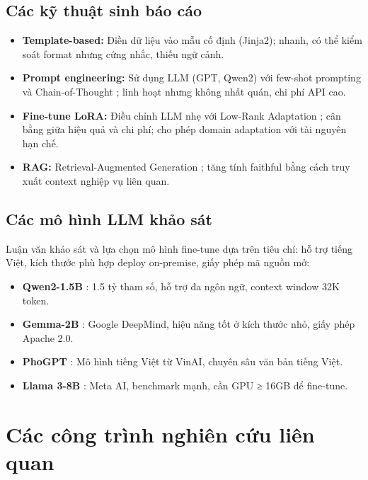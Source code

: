 \subsection{Các kỹ thuật sinh báo cáo}

\begin{itemize}
  \item \textbf{Template-based:} Điền dữ liệu vào mẫu cố định (Jinja2); nhanh, có thể kiểm soát format nhưng cứng nhắc, thiếu ngữ cảnh.
  \item \textbf{Prompt engineering:} Sử dụng LLM (GPT, Qwen2) với few-shot prompting và Chain-of-Thought \cite{wei2022chain}; linh hoạt nhưng không nhất quán, chi phí API cao.
  \item \textbf{Fine-tune LoRA:} Điều chỉnh LLM nhẹ với Low-Rank Adaptation \cite{hu2022lora}; cân bằng giữa hiệu quả và chi phí; cho phép domain adaptation với tài nguyên hạn chế.
  \item \textbf{RAG:} Retrieval-Augmented Generation \cite{lewis2020rag}; tăng tính faithful bằng cách truy xuất context nghiệp vụ liên quan.
\end{itemize}

\subsection{Các mô hình LLM khảo sát}

Luận văn khảo sát và lựa chọn mô hình fine-tune dựa trên tiêu chí: hỗ trợ tiếng Việt, kích thước phù hợp deploy on-premise, giấy phép mã nguồn mở:
\begin{itemize}
  \item \textbf{Qwen2-1.5B} \cite{qwen2023report}: 1.5 tỷ tham số, hỗ trợ đa ngôn ngữ, context window 32K token.
  \item \textbf{Gemma-2B} \cite{gemma2024}: Google DeepMind, hiệu năng tốt ở kích thước nhỏ, giấy phép Apache 2.0.
  \item \textbf{PhoGPT} \cite{nguyen2023phogpt}: Mô hình tiếng Việt từ VinAI, chuyên sâu văn bản tiếng Việt.
  \item \textbf{Llama 3-8B} \cite{touvron2023llama}: Meta AI, benchmark mạnh, cần GPU ≥ 16GB để fine-tune.
\end{itemize}

\section{Các công trình nghiên cứu liên quan}

